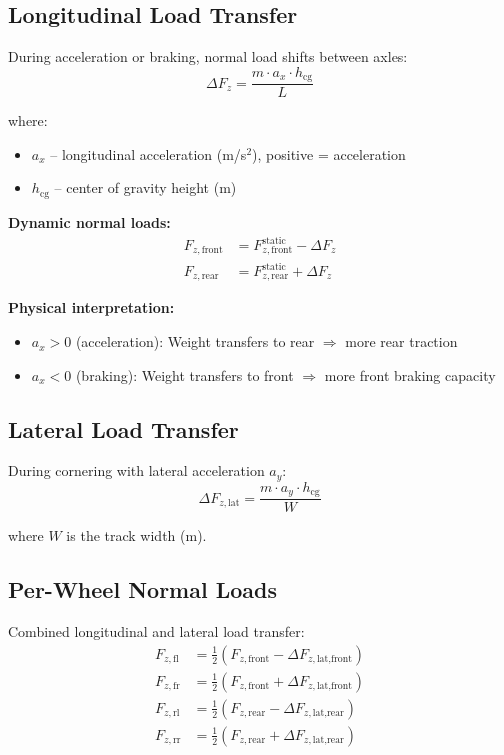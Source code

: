 \documentclass[11pt,a4paper]{article}
\begin{document}
\subsection{Longitudinal Load Transfer}

During acceleration or braking, normal load shifts between axles:
\begin{equation}
\boxed{\Delta F_z = \frac{m \cdot a_x \cdot h_{\text{cg}}}{L}}
\end{equation}

where:
\begin{itemize}
    \item $a_x$ -- longitudinal acceleration (m/s$^2$), positive = acceleration
    \item $h_{\text{cg}}$ -- center of gravity height (m)
\end{itemize}

\textbf{Dynamic normal loads:}
\begin{align}
F_{z,\text{front}} &= F_{z,\text{front}}^{\text{static}} - \Delta F_z \\
F_{z,\text{rear}} &= F_{z,\text{rear}}^{\text{static}} + \Delta F_z
\end{align}

\textbf{Physical interpretation:}
\begin{itemize}
    \item $a_x > 0$ (acceleration): Weight transfers to rear $\Rightarrow$ more rear traction
    \item $a_x < 0$ (braking): Weight transfers to front $\Rightarrow$ more front braking capacity
\end{itemize}

\subsection{Lateral Load Transfer}

During cornering with lateral acceleration $a_y$:
\begin{equation}
\Delta F_{z,\text{lat}} = \frac{m \cdot a_y \cdot h_{\text{cg}}}{W}
\end{equation}

where $W$ is the track width (m).

\subsection{Per-Wheel Normal Loads}

Combined longitudinal and lateral load transfer:
\begin{align}
F_{z,\text{fl}} &= \frac{1}{2}\left( F_{z,\text{front}} - \Delta F_{z,\text{lat,front}} \right) \\
F_{z,\text{fr}} &= \frac{1}{2}\left( F_{z,\text{front}} + \Delta F_{z,\text{lat,front}} \right) \\
F_{z,\text{rl}} &= \frac{1}{2}\left( F_{z,\text{rear}} - \Delta F_{z,\text{lat,rear}} \right) \\
F_{z,\text{rr}} &= \frac{1}{2}\left( F_{z,\text{rear}} + \Delta F_{z,\text{lat,rear}} \right)
\end{align}
\end{document}
